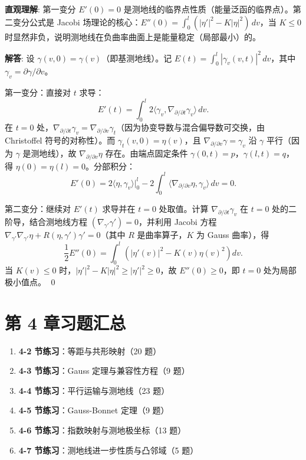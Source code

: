 \begin{solution}
\textbf{直观理解}: 第一变分 $E'(0)=0$ 是测地线的临界点性质（能量泛函的临界点）。第二变分公式是 Jacobi 场理论的核心：$E''(0) = \int_0^l(|\eta'|^2 - K|\eta|^2)\,dv$，当 $K\leq 0$ 时显然非负，说明测地线在负曲率曲面上是能量稳定（局部最小）的。

\textbf{解答}: 设 $\gamma(v,0) = \gamma(v)$（即基测地线）。记 $E(t) = \int_0^l |\gamma_v(v,t)|^2\, dv$，其中 $\gamma_v = \partial\gamma/\partial v$。

第一变分：直接对 $t$ 求导：
\[
E'(t) = \int_0^l 2\langle \gamma_v, \nabla_{\partial/\partial t}\gamma_v\rangle\, dv.
\]
在 $t=0$ 处，$\nabla_{\partial/\partial t}\gamma_v = \nabla_{\partial/\partial v}\gamma_t$（因为协变导数与混合偏导数可交换，由 Christoffel 符号的对称性）。而 $\gamma_t(v,0) = \eta(v)$，且 $\nabla_{\partial/\partial v}\gamma = \gamma_v$ 沿 $\gamma$ 平行（因为 $\gamma$ 是测地线），故 $\nabla_{\partial/\partial v}\eta$ 存在。由端点固定条件 $\gamma(0,t) = p$，$\gamma(l,t) = q$，得 $\eta(0) = \eta(l) = 0$。分部积分：
\[
E'(0) = 2\langle \eta, \gamma_v\rangle|_0^l - 2\int_0^l \langle \nabla_{\partial/\partial v}\eta, \gamma_v\rangle\, dv = 0.
\]

第二变分：继续对 $E'(t)$ 求导并在 $t=0$ 处取值。计算 $\nabla_{\partial/\partial t}\gamma_v$ 在 $t=0$ 处的二阶导，结合测地线方程 $(\nabla_{\gamma'}\gamma')=0$，并利用 Jacobi 方程 $\nabla_{\gamma'}\nabla_{\gamma'}\eta + R(\eta,\gamma')\gamma' = 0$（其中 $R$ 是曲率算子，$K$ 为 Gauss 曲率），得
\[
\frac12 E''(0) = \int_0^l\left(|\eta'(v)|^2 - K(v)\eta(v)^2\right) dv.
\]
当 $K(v) \leq 0$ 时，$|\eta'|^2 - K|\eta|^2 \geq |\eta'|^2 \geq 0$，故 $E''(0) \geq 0$，即 $t=0$ 处为局部极小值点。
\qed
\end{solution}

\section*{第 4 章习题汇总}

\begin{enumerate}
\item \textbf{4-2 节练习}：等距与共形映射（20 题）
\item \textbf{4-3 节练习}：Gauss 定理与兼容性方程（9 题）
\item \textbf{4-4 节练习}：平行运输与测地线（23 题）
\item \textbf{4-5 节练习}：Gauss-Bonnet 定理（9 题）
\item \textbf{4-6 节练习}：指数映射与测地极坐标（13 题）
\item \textbf{4-7 节练习}：测地线进一步性质与凸邻域（5 题）
\end{enumerate}

